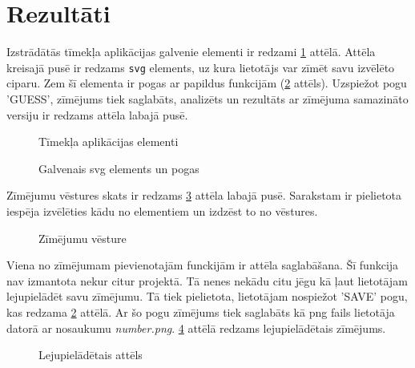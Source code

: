 \section{Rezultāti}

Izstrādātās tīmekļa aplikācijas galvenie elementi ir redzami \ref{orig:lapasElementi} attēlā. Attēla kreisajā pusē ir redzams \texttt{svg} elements, uz kura lietotājs var zīmēt savu izvēlēto ciparu. Zem šī elementa ir pogas ar papildus funkcijām (\ref{orig:svgElementi} attēls). Uzspiežot pogu 'GUESS', zīmējums tiek saglabāts, analizēts un rezultāts ar zīmējuma samazināto versiju ir redzams attēla labajā pusē.

\begin{figure}[H]
    \centering
    \caption{Tīmekļa aplikācijas elementi}
    \label{orig:lapasElementi}
\end{figure}

\begin{figure}[H]
    \centering
    \caption{Galvenais svg elements un pogas}
    \label{orig:svgElementi}
\end{figure}

\par Zīmējumu vēstures skats ir redzams \ref{orig:selection} attēla labajā pusē. Sarakstam ir pielietota iespēja izvēlēties kādu no elementiem un izdzēst to no vēstures.

\begin{figure}[H]
    \centering
    \caption{Zīmējumu vēsture}
    \label{orig:selection}
\end{figure}

\par Viena no zīmējumam pievienotajām funckijām ir attēla saglabāšana. Šī funkcija nav izmantota nekur citur projektā. Tā nenes nekādu citu jēgu kā ļaut lietotājam lejupielādēt savu zīmējumu. Tā tiek pielietota, lietotājam nospiežot 'SAVE' pogu, kas redzama \ref{orig:svgElementi} attēlā. Ar šo pogu zīmējums tiek saglabāts kā png fails lietotāja datorā ar nosaukumu \textit{number.png}. \ref{orig:downloadedFile} attēlā redzams lejupielādētais zīmējums.
\begin{figure}[H]
    \centering
    \caption{Lejupielādētais attēls}
    \label{orig:downloadedFile}
\end{figure}

